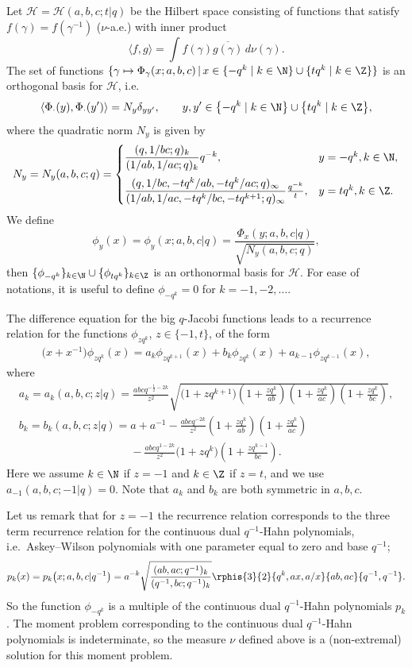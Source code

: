 Let $\mathcal H=\mathcal H(a,b,c;t|q)$ be the Hilbert space consisting of functions that satisfy $f(\gamma)=f(\gamma^{-1})$ ($\nu$-a.e.) with inner product
\[
\langle f ,g \rangle = \int f(\gamma) \overline{g(\gamma)}\, d\nu(\gamma).
\]
The set of functions $\{\gamma \mapsto \Phi_\gamma(x;a,b,c)\, | \, x \in \{-q^k\mid k \in \N\}\cup\{tq^k\mid k \in \Z \}\}$ is an orthogonal basis for $\mathcal H$, i.e.
\[
\langle \Phi_\cdot(y), \Phi_\cdot(y') \rangle = N_y \delta_{yy'}, \qquad y,y' \in \big\{{-}q^k\mid k \in \N\big\}\cup\big\{tq^k \mid k \in \Z\big\},
\]
where the quadratic norm $N_y$ is given by
\[
N_y =N_y(a,b,c;q)= \begin{cases}
 \dfrac{ (q,1/bc;q)_k }{(1/ab,1/ac;q)_k}q^{-k}, & y=-q^k, k \in \N ,\vspace{2mm}\\
 \dfrac{ (q,1/bc,-tq^k/ab, -tq^k/ac;q)_\infty }{ (1/ab,1/ac,-tq^k/bc, -tq^{k+1};q)_\infty }\frac{q^{-k}}{t}, & y=tq^k, k \in \Z.
\end{cases}
\]
We def\/ine
\[
\phi_y(x)=\phi_y(x;a,b,c|q) = \frac{\Phi_x(y;a,b,c|q)}{\sqrt{N_y(a,b,c;q)}},
\]
then $\{ \phi_{-q^k} \}_{k \in \N} \cup \{\phi_{tq^k} \}_{k \in \Z}$ is an orthonormal basis for $\mathcal H$. For ease of notations, it is useful to def\/ine $\phi_{-q^k}=0$ for $k=-1,-2,\ldots$.

The dif\/ference equation for the big $q$-Jacobi functions leads to a recurrence relation for the functions $\phi_{zq^k}$, $z\in\{-1,t\}$, of the form
\begin{gather} \label{eq:3termrecphi}
\big(x+x^{-1}\big)\phi_{zq^k}(x) = a_k \phi_{zq^{k+1}}(x) + b_k \phi_{zq^k}(x) + a_{k-1}\phi_{zq^{k-1}}(x),
\end{gather}
where
\begin{gather*}
a_k =a_k(a,b,c;z|q)=  \frac{ abcq^{-\frac12-2k} }{z^2} \sqrt{ \big(1+ zq^{k+1} \big) \left(1+\frac{ zq^k}{ab} \right) \left(1+\frac{zq^k}{ac} \right) \left(1+\frac{zq^k}{bc} \right) },\\
b_k =b_k(a,b,c;z|q)=  a+a^{-1} -\frac{abcq^{-2k}}{z^2}\left( 1+ \frac{zq^k}{ab} \right) \left( 1+ \frac{zq^k}{ac} \right)\\
\phantom{b_k =b_k(a,b,c;z|q)=}{}  -\frac{abcq^{1-2k}}{z^2} \big( 1+zq^k \big) \left( 1+\frac{zq^{k-1}}{bc} \right).
\end{gather*}
Here we assume $k \in \N$ if $z=-1$ and $k \in \Z$ if $z=t$, and we use $a_{-1}(a,b,c;-1|q)=0$. Note that $a_k$ and $b_k$ are both symmetric in $a,b,c$.

Let us remark that for $z=-1$ the recurrence relation corresponds to the three term recurrence relation for the continuous dual $q^{-1}$-Hahn polynomials, i.e.~Askey--Wilson polynomials with one parameter equal to zero and base $q^{-1}$;
\[
p_k(x)=p_k\big(x;a,b,c|q^{-1}\big) = a^{-k} \sqrt{ \frac{(ab,ac;q^{-1})_k}{(q^{-1}, bc;q^{-1})_k} } \rphis{3}{2}{q^{k}, ax, a/x}{ab, ac}{q^{-1}, q^{-1}}.
\]
So the function $\phi_{-q^k}$ is a multiple of the continuous dual $q^{-1}$-Hahn polynomials $p_k$. The moment problem corresponding to the continuous dual $q^{-1}$-Hahn polynomials is indeterminate, so the measure $\nu$ def\/ined above is a (non-extremal) solution for this moment problem.

